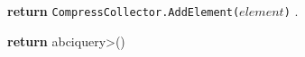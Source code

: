 \begin{figure}[t!]
  \begin{adjustbox}{minipage=[t]{\columnwidth}}
    \begin{algorithm}[H]
      \renewcommand{\thealgorithm}{API Compresschain}         
      \caption{}%
      \label{alg:api-brotli}%
      \small
      \begin{algorithmic}[1]
      
            \label{alg:brotli_add}
                \State \textbf{return} \texttt{CompressCollector.AddElement($element$)}
                .
            \EndFunction
      
            \label{alg:brotli_get}
                	\State \textbf{return} \<abciquery>()
            \EndFunction
            
        \end{algorithmic}
      \end{algorithm}
	\end{adjustbox}
  \end{figure}
